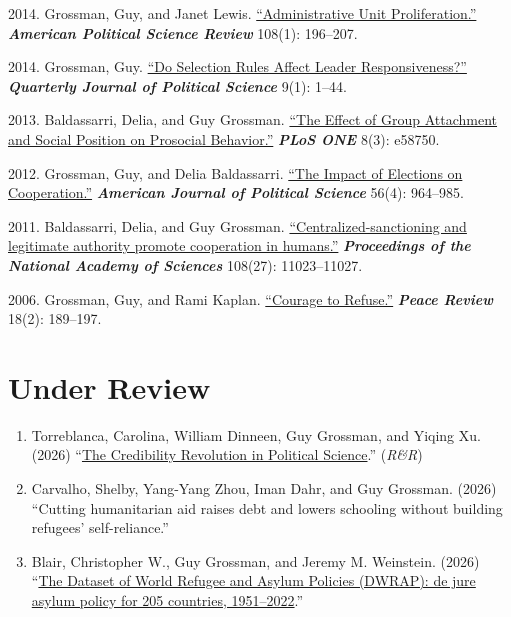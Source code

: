 \documentclass[10pt,a4paper]{article}
\begin{document}
\begin{etaremune}[leftmargin=2.5em, itemsep=8pt, topsep=4pt]
\item \textcolor{secondary}{2014.} Grossman, Guy, and Janet Lewis. \href{https://bit.ly/2GYCBvI}{``Administrative Unit Proliferation.''} \textbf{\textit{American Political Science Review}} 108(1): 196--207.

\item \textcolor{secondary}{2014.} Grossman, Guy. \href{https://bit.ly/2odzSo0}{``Do Selection Rules Affect Leader Responsiveness?''} \textbf{\textit{Quarterly Journal of Political Science}} 9(1): 1--44.

\item \textcolor{secondary}{2013.} Baldassarri, Delia, and Guy Grossman. \href{https://bit.ly/2whorQt}{``The Effect of Group Attachment and Social Position on Prosocial Behavior.''} \textbf{\textit{PLoS ONE}} 8(3): e58750.

\item \textcolor{secondary}{2012.} Grossman, Guy, and Delia Baldassarri. \href{https://bit.ly/2Y8EuvB}{``The Impact of Elections on Cooperation.''} \textbf{\textit{American Journal of Political Science}} 56(4): 964--985.

\item \textcolor{secondary}{2011.} Baldassarri, Delia, and Guy Grossman. \href{http://www.pnas.org/content/108/27/11023.short}{``Centralized-sanctioning and legitimate authority promote cooperation in humans.''} \textbf{\textit{Proceedings of the National Academy of Sciences}} 108(27): 11023--11027.

\item \textcolor{secondary}{2006.} Grossman, Guy, and Rami Kaplan. \href{https://www.tandfonline.com/doi/full/10.1080/10402650600692391}{``Courage to Refuse.''} \textbf{\textit{Peace Review}} 18(2): 189--197.

\end{etaremune}

\section{Under Review}

\begin{enumerate}[leftmargin=2em, itemsep=3pt, topsep=4pt]
\item Torreblanca, Carolina, William Dinneen, Guy Grossman, and Yiqing Xu. (2026) ``\href{https://osf.io/preprints/socarxiv/w2kmc_v4}{The Credibility Revolution in Political Science}.'' (\textit{R\&R})
\item Carvalho, Shelby, Yang-Yang Zhou, Iman Dahr, and Guy Grossman. (2026) ``Cutting humanitarian aid raises debt and lowers schooling without building refugees' self-reliance.''
\item Blair, Christopher W., Guy Grossman, and Jeremy M. Weinstein. (2026) ``\href{https://osf.io/preprints/socarxiv/6uqkt_v1}{The Dataset of World Refugee and Asylum Policies (DWRAP): de jure asylum policy for 205 countries, 1951--2022}.''

\end{enumerate}
\end{document}
